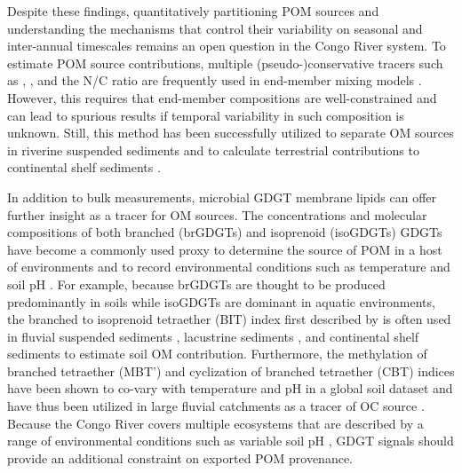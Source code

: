 Despite these findings, quantitatively partitioning POM sources and understanding the mechanisms that control their variability on seasonal and inter-annual timescales remains an open question in the Congo River system. To estimate POM source contributions, multiple (pseudo-)conservative tracers such as , , and the N/C ratio are frequently used in end-member mixing models \citep{Perdue:2007fn,Weijers:2009iu,Hilton:2010cg,Hossler:2012jh}. However, this requires that end-member compositions are well-constrained and can lead to spurious results if temporal variability in such composition is unknown. Still, this method has been successfully utilized to separate OM sources in riverine suspended sediments \citep{Hilton:2010cg,Hossler:2012jh} and to calculate terrestrial contributions to continental shelf sediments \citep{Gordon:2004id,Weijers:2009iu}. 

In addition to bulk measurements, microbial GDGT membrane lipids can offer further insight as a tracer for OM sources. The concentrations and molecular compositions of both branched (brGDGTs) and isoprenoid (isoGDGTs) GDGTs have become a commonly used proxy to determine the source of POM in a host of environments and to record environmental conditions such as temperature and soil pH \citep[see][for review]{Castaneda:2011jb,Schouten:2013bd}. For example, because brGDGTs are thought to be produced predominantly in soils while isoGDGTs are dominant in aquatic environments, the branched to isoprenoid tetraether (BIT) index first described by \citet{Hopmans:2004kx} is often used in fluvial suspended sediments \citep{Kim:2012fq,Zell:2014gt}, lacustrine sediments \citep{Tierney:2010br}, and continental shelf sediments \citep{Peterse:2009hl,Weijers:2009iu} to estimate soil OM contribution. Furthermore, the methylation of branched tetraether (MBT') and cyclization of branched tetraether (CBT) indices have been shown to co-vary with temperature and pH in a global soil dataset \citep{Weijers:2007gu,Peterse:2012bs,DeJonge:2014kw} and have thus been utilized in large fluvial catchments as a tracer of OC source \citep{Zell:2013eg,DeJonge:2014fs}. Because the Congo River covers multiple ecosystems that are described by a range of environmental conditions such as variable soil pH \citep{Mayaux:2004uw,Spencer:2012en}, GDGT signals should provide an additional constraint on exported POM provenance.

